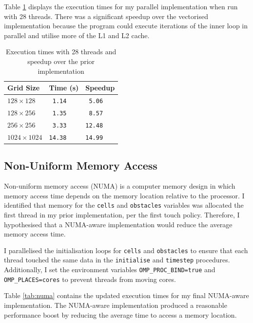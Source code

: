 \documentclass[twocolumn, a4paper]{article}
\begin{document}
Table \ref{tab:parallelised} displays the execution times for my parallel implementation when run with 28 threads.
There was a significant speedup over the vectorised implementation because the program could execute iterations of the inner loop in parallel and utilise more of the L1 and L2 cache.

\begin{table}[htbp]
  \begin{center}
  \caption{Execution times with 28 threads and speedup over the prior implementation}\label{tab:parallelised}
  \begin{tabular}[t]{l | l l} 
      \hline\hline
      Grid Size&Time (s)&Speedup\\
      \hline
      $128 \times 128$&\texttt{ 1.14}&\texttt{ 5.06}\\
      $128 \times 256$&\texttt{ 1.35}&\texttt{ 8.57}\\
      $256 \times 256$&\texttt{ 3.33}&\texttt{12.48}\\
      $1024 \times 1024$&\texttt{14.38}&\texttt{14.99}\\
      \hline
    \end{tabular}
  \end{center}
\end{table}

\subsection{Non-Uniform Memory Access}

Non-uniform memory access (NUMA) is a computer memory design in which memory access time depends on the memory location relative to the processor.
I identified that memory for the \texttt{cells} and \texttt{obstacles} variables was allocated the first thread in my prior implementation, per the first touch policy.
Therefore, I hypothesised that a NUMA-aware implementation would reduce the average memory access time.

I parallelised the initialisation loops for \texttt{cells} and \texttt{obstacles} to ensure that each thread touched the same data in the \texttt{initialise} and \texttt{timestep} procedures.
Additionally, I set the environment variables \texttt{OMP\_PROC\_BIND=true} and \texttt{OMP\_PLACES=cores} to prevent threads from moving cores.

Table \ref{tab:numa} contains the updated execution times for my final NUMA-aware implementation.
The NUMA-aware implementation produced a reasonable performance boost by reducing the average time to access a memory location.
\end{document}
